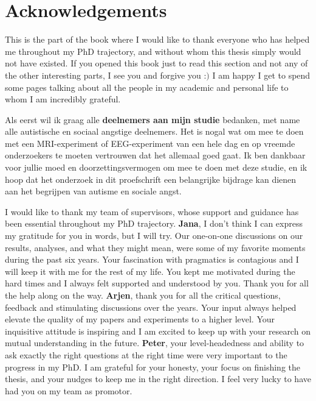 \chapter*{Acknowledgements}
\label{ch:acknowledgements}

This is the part of the book where I would like to thank everyone who has helped me throughout my PhD trajectory, and without whom this thesis simply would not have existed. If you opened this book just to read this section and not any of the other interesting parts, I see you and forgive you :$)$ I am happy I get to spend some pages talking about all the people in my academic and personal life to whom I am incredibly grateful.

Als eerst wil ik graag alle \textbf{deelnemers aan mijn studie} bedanken, met name alle autistische en sociaal angstige deelnemers. Het is nogal wat om mee te doen met een MRI-experiment of EEG-experiment van een hele dag en op vreemde onderzoekers te moeten vertrouwen dat het allemaal goed gaat. Ik ben dankbaar voor jullie moed en doorzettingsvermogen om mee te doen met deze studie, en ik hoop dat het onderzoek in dit proefschrift een belangrijke bijdrage kan dienen aan het begrijpen van autisme en sociale angst. 

I would like to thank my team of supervisors, whose support and guidance has been essential throughout my PhD trajectory. \newline 
\textbf{Jana}, I don't think I can express my gratitude for you in words, but I will try. Our one-on-one discussions on our results, analyses, and what they might mean, were some of my favorite moments during the past six years. Your fascination with pragmatics is contagious and I will keep it with me for the rest of my life. You kept me motivated during the hard times and I always felt supported and understood by you. Thank you for all the help along on the way. \newline
\textbf{Arjen}, thank you for all the critical questions, feedback and stimulating discussions over the years. Your input always helped elevate the quality of my papers and experiments to a higher level. Your inquisitive attitude is inspiring and I am excited to keep up with your research on mutual understanding in the future. \newline
\textbf{Peter}, your level-headedness and ability to ask exactly the right questions at the right time were very important to the progress in my PhD. I am grateful for your honesty, your focus on finishing the thesis, and your nudges to keep me in the right direction. I feel very lucky to have had you on my team as  promotor. 

